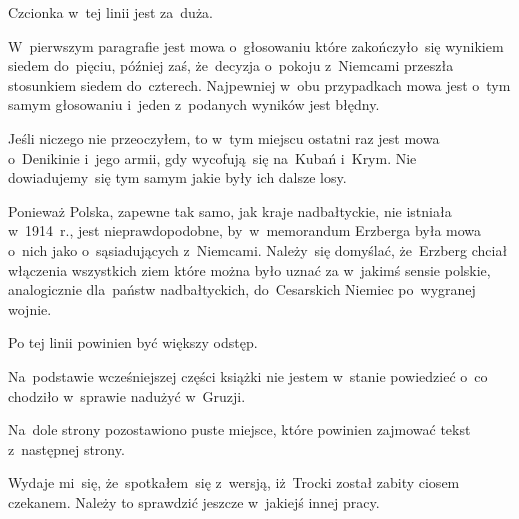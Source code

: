 \documentclass[a4paper,11pt]{article}
\begin{document}
\noindent
{} Czcionka w~tej linii jest za~duża.

\VerSpaceFour





\noindent
{} W~pierwszym paragrafie jest mowa o~głosowaniu które
zakończyło~się wynikiem siedem do~pięciu, później zaś, że~decyzja
o~pokoju z~Niemcami przeszła stosunkiem siedem do~czterech. Najpewniej
w~obu przypadkach mowa jest o~tym samym głosowaniu i~jeden z~podanych
wyników jest błędny.

\VerSpaceFour





\noindent
{} Jeśli niczego nie przeoczyłem, to w~tym miejscu ostatni raz jest
mowa o~Denikinie i~jego armii, gdy wycofują~się na~Kubań i~Krym. Nie
dowiadujemy~się tym samym jakie były ich dalsze losy.

\VerSpaceFour





\noindent
{} Ponieważ Polska, zapewne tak samo, jak kraje nadbałtyckie, nie
istniała w~1914~r., jest nieprawdopodobne, by~w~memorandum Erzberga była
mowa o~nich jako o~sąsiadujących z~Niemcami. Należy~się domyślać,
że~Erzberg chciał włączenia wszystkich ziem które można było uznać za
w~jakimś sensie polskie, analogicznie dla~państw nadbałtyckich,
do~Cesarskich Niemiec po~wygranej wojnie.

\VerSpaceFour





\noindent
{} Po tej linii powinien być większy odstęp.

\VerSpaceFour





\noindent
{} Na~podstawie wcześniejszej części książki nie jestem
w~stanie powiedzieć o~co chodziło w~sprawie nadużyć w~Gruzji.

\VerSpaceFour





\noindent
{} Na~dole strony pozostawiono puste miejsce, które powinien
zajmować tekst z~następnej strony.

\VerSpaceFour





\noindent
{} Wydaje mi~się, że~spotkałem~się z~wersją, iż~Trocki
został zabity ciosem czekanem. Należy to sprawdzić jeszcze w~jakiejś innej
pracy.
\end{document}
